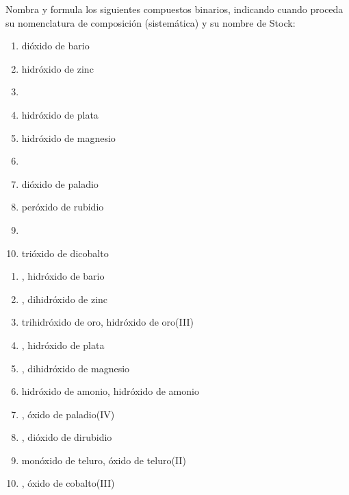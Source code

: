 \begin{exercise}[
    tags    = {inorgánica,compuestos binarios,óxidos,peróxidos,hidróxidos},
    topics  = {química inorgánica,formulación,nomenclatura},
    source  = {SAN Formulación, p27, e33},
  ]
  Nombra y formula los siguientes compuestos binarios, indicando cuando proceda su nomenclatura de composición (sistemática) y su nombre de Stock:

  \begin{enumerate}
    \item dióxido de bario
    \item hidróxido de zinc
    \item {}
    \item hidróxido de plata
    \item hidróxido de magnesio
    \item {}
    \item dióxido de paladio
    \item peróxido de rubidio
    \item {}
    \item trióxido de dicobalto
  \end{enumerate}
\end{exercise}

\begin{solution}
  \begin{enumerate}
    \item {}, hidróxido de bario
    \item {}, dihidróxido de zinc
    \item trihidróxido de oro, hidróxido de oro(III)
    \item {}, hidróxido de plata
    \item {}, dihidróxido de magnesio
    \item hidróxido de amonio, hidróxido de amonio
    \item {}, óxido de paladio(IV)
    \item {}, dióxido de dirubidio
    \item monóxido de teluro, óxido de teluro(II)
    \item {}, óxido de cobalto(III)
  \end{enumerate}
\end{solution}




